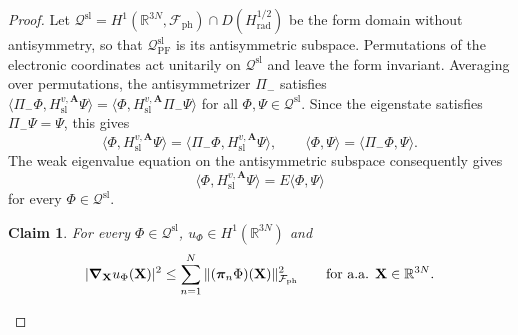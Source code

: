 \documentclass[final,reqno]{amsart}
\newtheorem*{claim}{Claim}
\theoremstyle{remark}
\newcommand{\RR}{\mathbb{R}}
\newcommand{\dua}[2]{\langle #1, #2 \rangle}
\newcommand{\DC}{D}
\newcommand{\PF}{\mathrm{PF}}
\newcommand{\ph}{\mathrm{ph}}
\newcommand{\rad}{\mathrm{rad}}
\newcommand{\Fock}{\mathcal{F}}
\newcommand{\vpi}{{\bm{\pi}}}
\newcommand{\vA}{{\mathbf{A}}}
\newcommand{\vX}{{\mathbf{X}}}
\begin{document}
\begin{proof}
Let
$\mathcal Q^{\mathrm{sl}}=H^1(\RR^{3N},\Fock_\ph)\cap\DC(H_\rad^{1/2})$
be the form domain without antisymmetry, so that
$\mathcal Q_\PF^{\mathrm{sl}}$ is its antisymmetric subspace.
Permutations of the electronic coordinates act unitarily on
$\mathcal Q^{\mathrm{sl}}$ and leave the form invariant.  Averaging over permutations,
the antisymmetrizer $\Pi_-$ satisfies
$\dua{\Pi_-\Phi}{H_{\mathrm{sl}}^{v,\vA}\Psi}
 =\dua{\Phi}{H_{\mathrm{sl}}^{v,\vA}\Pi_-\Psi}$ for all
$\Phi,\Psi\in\mathcal Q^{\mathrm{sl}}$.  Since the eigenstate satisfies $\Pi_-\Psi=\Psi$,
this gives
\[
 \dua{\Phi}{H_{\mathrm{sl}}^{v,\vA}\Psi}=\dua{\Pi_-\Phi}{H_{\mathrm{sl}}^{v,\vA}\Psi},\qquad
 \dua{\Phi}{\Psi}=\dua{\Pi_-\Phi}{\Psi}.
\]
The weak eigenvalue equation on the antisymmetric subspace consequently
gives
\begin{equation}\label{ucp-full-weak-equation}
 \dua{\Phi}{H_{\mathrm{sl}}^{v,\vA}\Psi}=E\dua{\Phi}{\Psi}
\end{equation}
for every $\Phi\in\mathcal Q^{\mathrm{sl}}$.

\begin{claim}
For every $\Phi\in\mathcal Q^{\mathrm{sl}}$, $u_\Phi\in H^1(\RR^{3N})$
and
\begin{equation}\label{ucp-diamagnetic}
 |\grad_{\vX}u_\Phi(\vX)|^2
 \leq\sum_{n=1}^N\|(\vpi_n\Phi)(\vX)\|_{\Fock_\ph}^2
 \qquad\text{for a.a. }\vX\in\RR^{3N}.
\end{equation}
\end{claim}


\end{proof}
\end{document}
